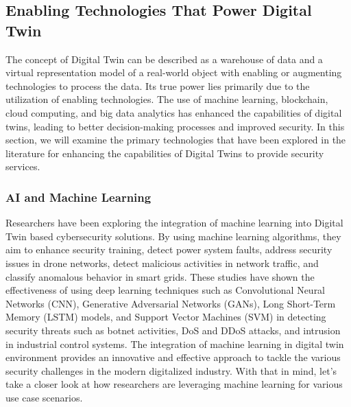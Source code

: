 
%
\subsection{Enabling Technologies That Power Digital Twin}
The concept of Digital Twin can be described as a warehouse of data and a virtual representation model of a real-world object with enabling or augmenting technologies to process the data. Its true power lies primarily due to the utilization of enabling technologies\cite{sousaELEGANTSecurityCritical2021}. The use of machine learning, blockchain, cloud computing, and big data analytics has enhanced the capabilities of digital twins, leading to better decision-making processes and improved security. In this section, we will examine the primary technologies that have been explored in the literature for enhancing the capabilities of Digital Twins to provide security services.


\subsubsection{AI and Machine Learning}
Researchers have been exploring the integration of machine learning into Digital Twin based cybersecurity solutions. By using machine learning algorithms, they aim to enhance security training, detect power system faults, address security issues in drone networks, detect malicious activities in network traffic, and classify anomalous behavior in smart grids. These studies have shown the effectiveness of using deep learning techniques such as Convolutional Neural Networks (CNN), Generative Adversarial Networks (GANs), Long Short-Term Memory (LSTM) models, and Support Vector Machines (SVM) in detecting security threats such as botnet activities, DoS and DDoS attacks, and intrusion in industrial control systems. The integration of machine learning in digital twin environment provides an innovative and effective approach to tackle the various security challenges in the modern digitalized industry. With that in mind, let's take a closer look at how researchers are leveraging machine learning for various use case scenarios.  

